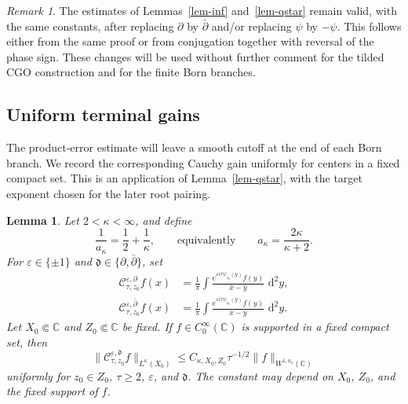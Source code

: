 \documentclass[a4paper,11pt]{article}
\newcommand{\C}{\mathbb{C}}
\newcommand{\dd}{\,\text{d}}
\theoremstyle{plain}
\newtheorem{lem}[thm]{Lemma}
\theoremstyle{definition}
\theoremstyle{remark}
\newtheorem{rem}[thm]{Remark}
\begin{document}
\begin{rem}\label{rem-cauchy-involution}
The estimates of Lemmas~\ref{lem-inf} and~\ref{lem-qstar} remain valid, with the same constants, after replacing $\partial$ by $\bar\partial$ and/or replacing $\psi$ by $-\psi$.  This follows either from the same proof or from conjugation together with reversal of the phase sign.  These changes will be used without further comment for the tilded CGO construction and for the finite Born branches.
\end{rem}

\subsection{Uniform terminal gains}

The product-error estimate will leave a smooth cutoff at the end of each Born branch. We record the corresponding Cauchy gain uniformly for centers in a fixed compact set. This is an application of Lemma~\ref{lem-qstar}, with the target exponent chosen for the later root pairing.
\begin{lem}\label{lem-terminal-cauchy-gain}
Let $2<\kappa<\infty$, and define
\begin{equation}\label{qs-terminal-def}
        \frac1{a_\kappa}=\frac12+\frac1\kappa,
        \qquad\text{equivalently}\qquad
        a_\kappa=\frac{2\kappa}{\kappa+2}.
\end{equation}
For $\varepsilon\in\{\pm1\}$ and
$\mathfrak d\in\{\partial,\bar\partial\}$, set
\begin{align}
\mathcal C_{\tau,z_0}^{\varepsilon,\partial}f(x)
 &=\frac1\pi\int
        \frac{e^{\varepsilon i\tau\psi_{z_0}(y)}f(y)}
             {\bar x-\bar y}\,\dd^2y,\label{terminal-cauchy-partial}\\
\mathcal C_{\tau,z_0}^{\varepsilon,\bar\partial}f(x)
 &=\frac1\pi\int
        \frac{e^{\varepsilon i\tau\psi_{z_0}(y)}f(y)}
             {x-y}\,\dd^2y .\label{terminal-cauchy-barpartial}
\end{align}
Let $X_0\Subset\C$ and $Z_0\Subset\C$ be fixed.  If
$f\in C_0^\infty(\C)$ is supported in a fixed compact set, then
\begin{equation}\label{terminal-cauchy-gain}
        \|\mathcal C_{\tau,z_0}^{\varepsilon,\mathfrak d}f\|_{L^\kappa(X_0)}
        \le C_{\kappa,X_0,Z_0}\tau^{-1/2}\|f\|_{W^{1,a_\kappa}(\C)}
\end{equation}
uniformly for $z_0\in Z_0$, $\tau\ge2$, $\varepsilon$, and $\mathfrak d$.  The constant
may depend on $X_0$, $Z_0$, and the fixed support of $f$.
\end{lem}
\end{document}
